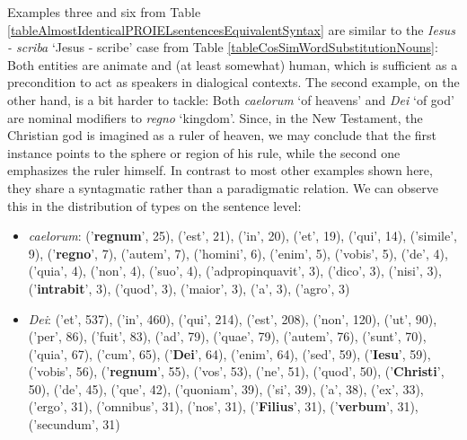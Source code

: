 Examples three and six from Table \ref{tableAlmostIdenticalPROIELsentencesEquivalentSyntax} are similar to the \textit{Iesus - scriba} `Jesus - scribe' case from Table \ref{tableCosSimWordSubstitutionNouns}: Both entities are animate and (at least somewhat) human, which is sufficient as a precondition to act as speakers in dialogical contexts. The second example, on the other hand, is a bit harder to tackle: Both \textit{caelorum} `of heavens' and \textit{Dei} `of god' are nominal modifiers to \textit{regno} `kingdom'. Since, in the New Testament, the Christian god is imagined as a ruler of heaven, we may conclude that the first instance points to the sphere or region of his rule, while the second one emphasizes the ruler himself. In contrast to most other examples shown here, they share a syntagmatic rather than a paradigmatic relation. We can observe this in the distribution of types on the sentence level:

\begin{itemize}
    \item \textit{caelorum}: ('\textbf{regnum}', 25), ('est', 21), ('in', 20), ('et', 19), ('qui', 14), ('simile', 9), ('\textbf{regno}', 7), ('autem', 7), ('homini', 6), ('enim', 5), ('vobis', 5), ('de', 4), ('quia', 4), ('non', 4), ('suo', 4), ('adpropinquavit', 3), ('dico', 3), ('nisi', 3), ('\textbf{intrabit}', 3), ('quod', 3), ('maior', 3), ('a', 3), ('agro', 3)
    \item \textit{Dei}: ('et', 537), ('in', 460), ('qui', 214), ('est', 208), ('non', 120), ('ut', 90), ('per', 86), ('fuit', 83), ('ad', 79), ('quae', 79), ('autem', 76), ('sunt', 70), ('quia', 67), ('cum', 65), ('\textbf{Dei}', 64), ('enim', 64), ('sed', 59), ('\textbf{Iesu}', 59), ('vobis', 56), ('\textbf{regnum}', 55), ('vos', 53), ('ne', 51), ('quod', 50), ('\textbf{Christi}', 50), ('de', 45), ('que', 42), ('quoniam', 39), ('si', 39), ('a', 38), ('ex', 33), ('ergo', 31), ('omnibus', 31), ('nos', 31), ('\textbf{Filius}', 31), ('\textbf{verbum}', 31), ('secundum', 31)
\end{itemize}

